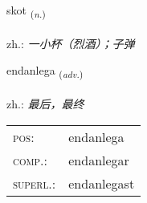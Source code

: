 \documentclass[frontgrid, backgrid]{flacards}\usepackage[]{graphicx}\usepackage[]{xcolor}
\begin{document}
\renewcommand{\flhead}{\vskip5pt \fboxsep=0pt {\small\bfseries\footnotesize Nafnorð | 名词}}
\renewcommand{\fcfoot}{\vskip5pt \fboxsep=0pt \hspace{2pt}{\small\bfseries\footnotesize 3K}}

\renewcommand{\blhead}{\vskip5pt {\small\bfseries\footnotesize Nafnorð | 名词 }}
\renewcommand{\bcfoot}{\vskip5pt \hspace{2pt}{\small\bfseries\footnotesize 3K}}


{skot \small{\textsubscript{(\textit{n.})}} \\[1ex] %
\textphonetic{[skɔːt]} \\
zh.: \emph{一小杯（烈酒）；子弹} \\  [2ex]
\renewcommand*{\arraystretch}{0.8}
}

\renewcommand{\flhead}{\vskip5pt \fboxsep=0pt {\small\bfseries\footnotesize Sagnorð | 副词}}
\renewcommand{\fcfoot}{\vskip5pt \fboxsep=0pt \hspace{2pt}{\small\bfseries\footnotesize 3K}}

\renewcommand{\blhead}{\vskip5pt {\small\bfseries\footnotesize Sagnorð | 副词 }}
\renewcommand{\bcfoot}{\vskip5pt \hspace{2pt}{\small\bfseries\footnotesize 3K}}


{endanlega \small{\textsubscript{(\textit{adv.})}} \\[1ex] %
\textphonetic{[ɛntanlɛɣa]} \\
zh.: \emph{最后，最终} \\  [2ex]
\renewcommand*{\arraystretch}{0.8}
\begin{tabular}{ll}
\textsc{pos}: & endanlega \\ 
\textsc{comp.}: & endanlegar \\ 
\textsc{superl.}: & endanlegast \\
\end{tabular}
}
\end{document}
